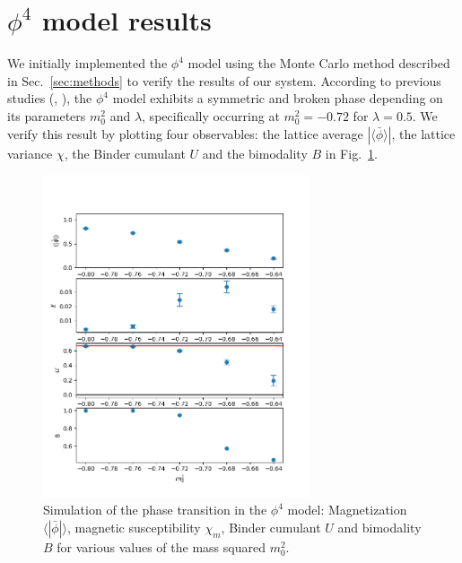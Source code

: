 \documentclass[12pt]{report}
\begin{document}
\section{$\phi^4$ model results}

We initially implemented the $\phi^4$ model using the Monte Carlo method described in Sec.~\ref{sec:methods} to verify the results of our system. According to previous studies (\cite{monahan2016}, \cite{schaich2006}), the $\phi^4$ model exhibits a symmetric and broken phase depending on its parameters $m_0^2$ and $\lambda$, specifically occurring at $m_0^2 = -0.72$ for $\lambda = 0.5$. We verify this result by plotting four observables: the lattice average $|\langle\bar\phi\rangle|$, the lattice variance $\chi$, the Binder cumulant $U$ and the bimodality $B$ in Fig.~\ref{fig:phi4}.
\begin{figure}[h]
    \centering
      \includegraphics[width=0.7\textwidth]{imgs/phi4.png}
      \caption{\label{fig:phi4} Simulation of the phase transition in the $\phi^4$ model: Magnetization $\langle |\bar\phi|\rangle$, magnetic susceptibility $\chi_m$, Binder cumulant $U$ and bimodality $B$ for various values of the mass squared $m_0^2$.}
\end{figure}
\end{document}
